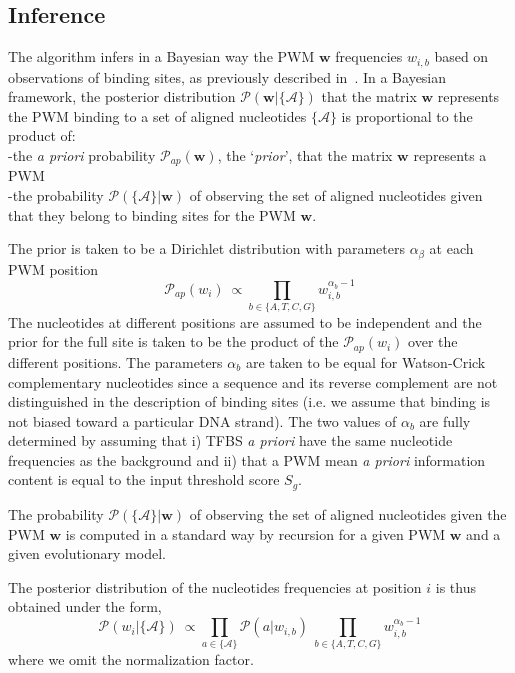 \documentclass[a4,center,fleqn]{NAR}
\newcommand{\proba}{\mathcal{P}}
\begin{document}
\subsection*{Inference}

The algorithm  infers in a Bayesian way the PWM $\mathbf{w}$ frequencies
$w_{i,b}$ based on observations of binding sites, as previously described
in~\cite{Rouault:2010fk}.
In a Bayesian framework,  the posterior distribution
$\proba(\mathbf{w}|\{\mathcal{A}\})$ that the matrix $\mathbf{w}$ represents
the PWM binding to a set of aligned nucleotides $\{\mathcal{A}\}$ is
proportional to the product of:\\
-the {\em a priori} probability $\proba_{ap}(\mathbf{w})$, the `{\em  prior}',
that the matrix $\mathbf{w}$ represents a PWM\\
-the probability $\proba(\{\mathcal{A}\}|\mathbf{w})$ of observing the set of
aligned nucleotides given that they belong to binding sites for the PWM
$\mathbf{w}$.

The prior is taken to be a Dirichlet distribution with parameters $\alpha_\beta$ at each PWM position
\begin{equation}
 \proba_{ap}(w_{i})\ \propto 
   \prod_{b \in \{A,T,C,G\}} w_{i,b}^{\alpha_b-1}
\end{equation}
The nucleotides at different positions are assumed to be independent and the
prior for the full site is taken to be the product of the $ \proba_{ap}(w_{i})$
over the different positions.
The parameters $\alpha_b$ are taken to be equal for Watson-Crick complementary
nucleotides since a sequence and its reverse complement are not distinguished
in the description of binding sites (i.e. we assume that binding is not biased
toward a particular DNA strand).
The two values of $\alpha_b$ are fully determined by assuming that i) TFBS {\em
a priori} have the same nucleotide frequencies as the background and ii) that
a PWM mean {\em a priori} information content is equal to the input threshold
score $S_g$.

The probability $\proba(\{\mathcal{A}\}|\mathbf{w})$ of observing the set of
aligned nucleotides given the PWM $\mathbf{w}$ is computed in a standard way
\cite{Felsenstein:1981ve} by recursion for a given PWM $\mathbf{w}$ and a given
evolutionary model.

The posterior distribution of the nucleotides frequencies at position $i$ is
thus obtained under the form,
\begin{equation}
   \proba(w_{i}|\{\mathcal{A}\})\ \propto \prod_{a \in \{\mathcal{A}\}} \proba(a|w_{i,b})\
   \prod_{b \in \{A,T,C,G\}} w_{i,b}^{\alpha_b-1}
   \label{bayes}
\end{equation}
where we omit the normalization factor.
\end{document}
